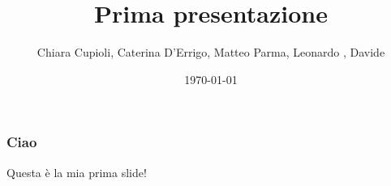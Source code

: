 \documentclass{beamer}
\title{Prima presentazione}
\author{Chiara Cupioli, Caterina D'Errigo, Matteo Parma, Leonardo , Davide}
\date{\today}
\begin{document}
\frame{\titlepage}

\begin{frame}
\frametitle{Ciao}
Questa è la mia prima slide!
\end{frame}
\end{document}

